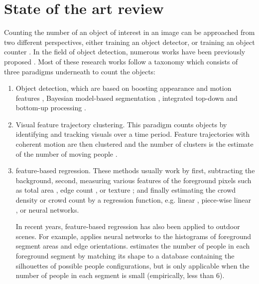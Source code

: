 \newpage
\chapter{State of the art review}

\label{sec:stateoftheart}
Counting the number of an object of interest in an image can be approached from two different perspectives, either training an object detector, or training an object counter \cite{segui2015learning}. In the field of object detection, numerous works have been previously proposed \cite{paragios2001mrf, cho1999neural, regazzoni1996distributed, davies1995crowd, kong2005counting, marana1998efficacy, viola2004robust}. Most of these research works follow a taxonomy which consists of three paradigms underneath to count the objects:
\begin{enumerate}
	\item Object detection, which are based on boosting appearance and motion features \cite{viola2005detecting, viola2004robust}, Bayesian model-based segmentation \cite{zhao2003bayesian}, integrated top-down and bottom-up processing \cite{leibe2005pedestrian, oliva2003top,chan2008privacy}.
	\item Visual feature trajectory clustering. This paradigm counts objects by identifying and tracking visuals over a  time period. Feature trajectories with coherent motion are then clustered and the number of clusters is the estimate of the number of moving people \cite{rabaud2006counting, brostow2006unsupervised,chan2008privacy}. 
	\item feature-based regression. These methods usually work by first, subtracting the background, second, measuring various features of the foreground pixels such as total area \cite{paragios2001mrf, davies1995crowd}, edge count \cite{cho1999neural, regazzoni1996distributed}, or texture \cite{marana1998efficacy}; and finally estimating the crowd density or crowd count by a regression function, e.g. linear \cite{paragios2001mrf, davies1995crowd}, piece-wise linear \cite{regazzoni1996distributed}, or neural networks\cite{cho1999neural, regazzoni1996distributed}. 

	\indent In recent years, feature-based regression has also been applied to outdoor scenes. For example, \citealt{kong2005counting} applies neural networks to the histograms of foreground segment areas and edge orientations. \citealt{dong2007fast} estimates the number of people in each foreground segment by matching its shape to a database containing the silhouettes of possible people configurations, but is only applicable when the number of people in each segment is small (empirically, less than 6)\cite{chan2008privacy}.  
\end{enumerate} 
